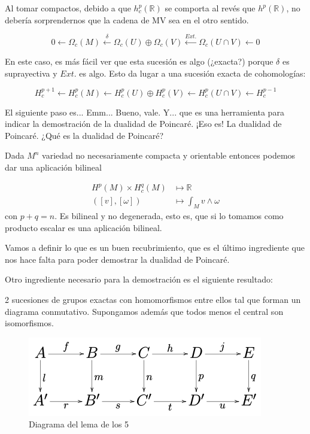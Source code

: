 \documentclass[palatino, bibnumbers]{apuntes}
\begin{document}
Al tomar compactos, debido a que $h^p_c(ℝ)$ se comporta al revés que $h^p(ℝ)$, no debería sorprendernos que la cadena de MV sea en el otro sentido.

\[
	0 \leftarrow Ω_c(M) \overset{δ}{\leftarrow} Ω_c(U) \oplus Ω_c(V) \overset{Ext.}{\leftarrow} Ω_c(U\cap V) \leftarrow 0
\]

En este caso, es más fácil ver que esta sucesión es algo (¿exacta?) porque $δ$ es suprayectiva y $Ext.$ es algo.
Esto da lugar a una sucesión exacta de cohomologías:

\[
	H_c^{p+1} \leftarrow H_c^p(M) \leftarrow H_c^p(U) \oplus H_c^p(V) \leftarrow H_c^p(U\cap V) \leftarrow H_c^{p-1}
\]


El siguiente paso es... Emm... Bueno, vale. Y... que es una herramienta para indicar la demostración de la dualidad de Poincaré. ¡Eso es! La dualidad de Poincaré. ¿Qué es la dualidad de Poincaré?

\begin{lemma}


 Dada $M^n$ variedad no necesariamente compacta y orientable entonces podemos dar una aplicación bilineal

 \begin{align*}
	H^p(M) × H_c^q(M) &\longmapsto ℝ \\
	([v],[ω]) & \longmapsto \int_M v ∧ ω
\end{align*}
con $p + q = n$.
Es bilineal y no degenerada, esto es, que si lo tomamos como producto escalar es una aplicación bilineal.
\end{lemma}

Vamos a definir lo que es un buen recubrimiento, que es el último ingrediente que nos hace falta para poder demostrar la dualidad de Poincaré.


Otro ingrediente necesario para la demostración es el siguiente resultado:

\begin{lemma}
\label{lemma:delos5}
2 sucesiones de grupos exactas con homomorfismos entre ellos tal que forman un diagrama conmutativo. Supongamos además que todos menos el central son isomorfismos.
\end{lemma}

\begin{figure}[hbtp]
\centering
\includegraphics[scale=0.7]{img/lemadelos5.png}
\caption{Diagrama del lema de los 5}
\label{img:delos5}
\end{figure}
\end{document}
